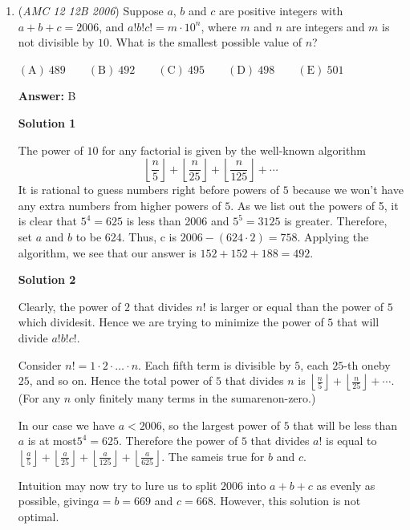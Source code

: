 \begin{enumerate}
 


	\item (\textit{AMC 12 12B 2006}) Suppose $a$, $b$ and $c$ are positive integers with $a+b+c=2006$, and $a!b!c!=m\cdot 10^n$, where $m$ and $n$ are integers and $m$ is not divisible by $10$. What is the smallest possible value of $n$?


 $\mathrm{(A)}\ 489 \qquad \mathrm{(B)}\ 492  \qquad \mathrm{(C)}\ 495 \qquad \mathrm{(D)}\ 498 \qquad \mathrm{(E)}\ 501$

 \textbf{Answer: }B



\textbf{Solution 1}

The power of $10$ for any factorial is given by the well-known algorithm 
 \[\left\lfloor \frac n{5}\right\rfloor + \left\lfloor \frac n{25}\right\rfloor + \left\lfloor \frac n{125}\right\rfloor + \cdots\]It is rational to guess numbers right before powers of $5$ because we won't have any extra numbers from higher powers of $5$. As we list out the powers of 5, it is clear that $5^{4}=625$ is less than 2006 and  $5^{5}=3125$ is greater. Therefore, set $a$ and $b$ to be 624. Thus, c is $2006-(624\cdot 2)=758$. Applying the algorithm, we see that our answer is $152+152+188= \boxed{492}$.

 



\textbf{Solution 2}

Clearly, the power of $2$ that divides $n!$ is larger or equal than the power of $5$ which dividesit. Hence we are trying to minimize the power of $5$ that will divide $a!b!c!$.

 Consider $n! = 1\cdot 2 \cdot \dots \cdot n$. Each fifth term is divisible by $5$, each $25$-th oneby $25$, and so on. Hence the total power of $5$ that divides $n$ is $\left\lfloor \frac n{5}\right\rfloor + \left\lfloor \frac n{25}\right\rfloor + \cdots$. (For any $n$ only finitely many terms in the sumarenon-zero.)

 In our case we have $a<2006$, so the largest power of $5$ that will be less than $a$ is at most$5^4 = 625$. Therefore the power of $5$ that divides $a!$ is equal to $\left\lfloor \frac a{5}\right\rfloor + \left\lfloor \frac a{25}\right\rfloor + \left\lfloor \frac a{125}\right\rfloor + \left\lfloor \frac a{625}\right\rfloor$. The sameis true for $b$ and $c$.

 Intuition may now try to lure us to split $2006$ into $a+b+c$ as evenly as possible, giving$a=b=669$ and $c=668$. However, this solution is not optimal.


\end{enumerate}
